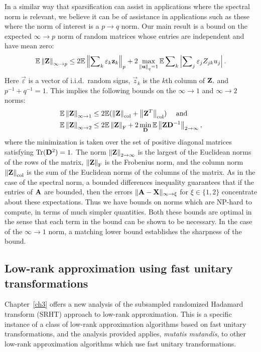 In a similar way that sparsification can assist in applications where the 
spectral norm is relevant, we believe it can be of assistance in applications
such as these where the norm of interest is a $p \rightarrow q$ norm. Our main 
result is a bound on the expected $\infty \rightarrow p$ norm of random matrices 
whose entries are independent and have mean zero:
\[
\mathbb{E}\left\|\mathbf{Z}\right\|_{\infty\rightarrow p} \leq 
2\mathbb{E}\left\|\sum\nolimits_k \varepsilon_k \mathbf{z}_k\right\|_p + 2 \max_{\left\|\mathbf{u}\right\|_q = 1} 
\mathbb{E}\sum\nolimits_k \left|\sum\nolimits_j \varepsilon_j Z_{jk} u_j \right|.
\]
Here $\vec{\varepsilon}$ is a vector of i.i.d.~random signs, $\vec{z}_k$ is the 
$k$th column of $\mathbf{Z},$ and $p^{-1} + q^{-1} = 1$. This implies
the following bounds on the $\infty \rightarrow 1$ and $\infty \rightarrow 2$ norms:
\begin{align*}
 \mathbb{E}\left\|\mathbf{Z}\right\|_{\infty\rightarrow 1} & \leq2\mathbb{E}(\left\|\mathbf{Z}\right\|_{\mathrm{col}}+\left\|\mathbf{Z}^T\right\|_{\mathrm{col}})\quad \text{ and} \\
 \mathbb{E}\left\|\mathbf{Z}\right\|_{\infty\rightarrow 2} & \leq2\mathbb{E}\left\|\mathbf{Z}\right\|_{\mathrm{F}}+2\min_{\mathbf{D}}\mathbb{E}\left\|\mathbf{Z}\mathbf{D}^{-1}\right\|_{2\rightarrow\infty},
\end{align*}
where the minimization is taken over the set of positive diagonal matrices 
satisfying $\operatorname{Tr}(\mathbf{D}^2) = 1.$ The norm $\left\|\mathbf{Z}\right\|_{2\rightarrow\infty}$ 
is the largest of the Euclidean norms of the rows of the matrix, $\left\|\mathbf{Z}\right\|_{\mathrm{F}}$ 
is the Frobenius norm, and the column norm $\left\|\mathbf{Z}\right\|_{\mathrm{col}}$ is the sum of the 
Euclidean norms of the columns of the matrix. As in the case of the spectral norm, 
a bounded differences inequality 
guarantees that if the entries of $\mathbf{A}$ are bounded, then the errors 
$\|\mathbf{A} - \mathbf{X}\|_{\infty \rightarrow \xi}$ for $\xi \in \{1,2\}$ concentrate about these expectations. 
Thus we have bounds on norms which 
are NP-hard to compute, in terms of much simpler quantities. Both these bounds
are optimal in the sense that each term in the bound can be shown to be necessary.
In the case of the $\infty \rightarrow 1$ norm, a matching lower bound
establishes the sharpness of the bound.

\subsection{Low-rank approximation using fast unitary transformations}

Chapter~\ref{ch3} offers a new analysis of the subsampled randomized Hadamard 
transform (SRHT) approach to low-rank approximation. This is a specific instance 
of a class of low-rank approximation algorithms based on fast unitary
transformations, and the analysis provided applies, \emph{mutatis mutandis}, to
other low-rank approximation algorithms which use fast unitary transformations.

